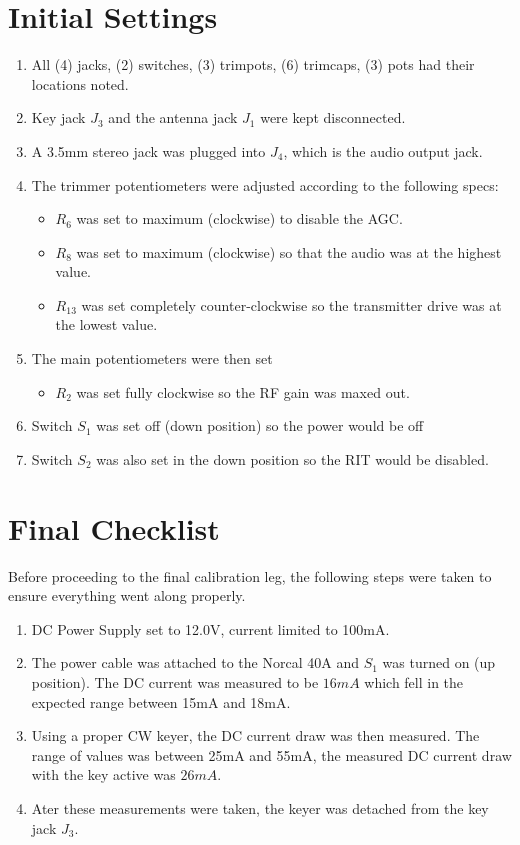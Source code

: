 \documentclass{./cls/hw}
\begin{document}
\section{Initial Settings}
  \begin{enumerate}
    \item All (4) jacks, (2) switches, (3) trimpots, (6) trimcaps, (3) pots had
      their locations noted.
    \item Key jack $J_3$ and the antenna jack $J_1$ were kept disconnected.
    \item A 3.5mm stereo jack was plugged into $J_4$, which is the audio output
      jack.
    \item The trimmer potentiometers were adjusted according to the following specs:
      \begin{itemize}
        \item $R_6$ was set to maximum (clockwise) to disable the AGC.
        \item $R_8$ was set to maximum (clockwise) so that the audio was at the highest
          value.
        \item $R_{13}$ was set completely counter-clockwise so the transmitter
          drive was at the lowest value.
      \end{itemize}
    \item The main potentiometers were then set
      \begin{itemize}
          \item $R_2$ was set fully clockwise so the RF gain was maxed out.
      \end{itemize}
    \item Switch $S_1$ was set off (down position) so the power would be off
    \item Switch $S_2$ was also set in the down position so the RIT would be
      disabled.
  \end{enumerate}
\section{Final Checklist}
Before proceeding to the final calibration leg, the following steps were taken
to ensure everything went along properly.
\begin{enumerate}
  \item DC Power Supply set to 12.0V, current limited to 100mA.
  \item The power cable was attached to the Norcal 40A and $S_1$ was turned on
    (up position). The DC current was measured to be $\boxed{16 mA}$ which fell in the
    expected range between 15mA and 18mA.
  \item Using a proper CW keyer, the DC current draw was then measured. The
    range of values was between 25mA and 55mA, the measured DC current draw
    with the key active was $\boxed{26 mA}$.
  \item Ater these measurements were taken, the keyer was detached from the key
    jack $J_3$.
\end{enumerate}
\end{document}
